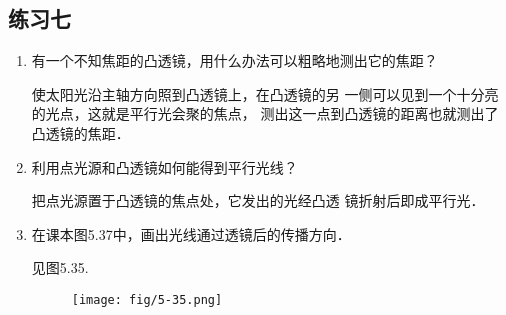 \subsection{练习七}
\begin{enumerate}
    \item 有一个不知焦距的凸透镜，用什么办法可以粗略地测出它的焦距？

    \begin{solution}
使太阳光沿主轴方向照到凸透镜上，在凸透镜的另
一侧可以见到一个十分亮的光点，这就是平行光会聚的焦点，
测出这一点到凸透镜的距离也就测出了凸透镜的焦距．
    \end{solution}
    \item 利用点光源和凸透镜如何能得到平行光线？

    \begin{solution}
把点光源置于凸透镜的焦点处，它发出的光经凸透
镜折射后即成平行光．
    \end{solution}
    \item 在课本图5.37中，画出光线通过透镜后的传播方向．

    \begin{solution}
        见图5.35.
\begin{figure}[htp]
    \centering
    \texttt{[image: fig/5-35.png]}
    \caption{}
\end{figure}
    \end{solution}
\end{enumerate}





